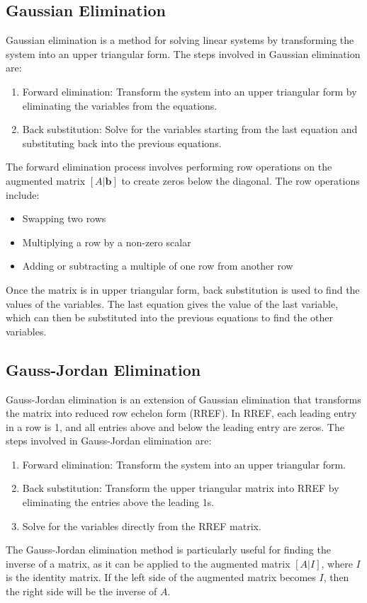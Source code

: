 \subsection{Gaussian Elimination}

Gaussian elimination is a method for solving linear systems by transforming the system into an upper triangular form. The steps involved in Gaussian elimination are:
\begin{enumerate}
	\item Forward elimination: Transform the system into an upper triangular form by eliminating the variables from the equations.
	\item Back substitution: Solve for the variables starting from the last equation and substituting back into the previous equations.
\end{enumerate}
The forward elimination process involves performing row operations on the augmented matrix \([A | \mathbf{b}]\) to create zeros below the diagonal. The row operations include:
\begin{itemize}[label=\(-\)]
	\item Swapping two rows
	\item Multiplying a row by a non-zero scalar
	\item Adding or subtracting a multiple of one row from another row
\end{itemize}
Once the matrix is in upper triangular form, back substitution is used to find the values of the variables. The last equation gives the value of the last variable, which can then be substituted into the previous equations to find the other variables.

\subsection{Gauss-Jordan Elimination}

Gauss-Jordan elimination is an extension of Gaussian elimination that transforms the matrix into reduced row echelon form (RREF). In RREF, each leading entry in a row is 1, and all entries above and below the leading entry are zeros. The steps involved in Gauss-Jordan elimination are:
\begin{enumerate}
	\item Forward elimination: Transform the system into an upper triangular form.
	\item Back substitution: Transform the upper triangular matrix into RREF by eliminating the entries above the leading 1s.
	\item Solve for the variables directly from the RREF matrix.
\end{enumerate}
The Gauss-Jordan elimination method is particularly useful for finding the inverse of a matrix, as it can be applied to the augmented matrix \([A | I]\), where \(I\) is the identity matrix. If the left side of the augmented matrix becomes \(I\), then the right side will be the inverse of \(A\).

